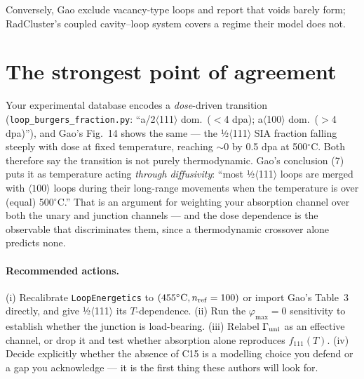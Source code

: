 \documentclass[11pt,a4paper]{article}
\newcommand{\code}[1]{\texttt{\small #1}}
\begin{document}
Conversely, Gao exclude vacancy-type loops and report that voids barely form; RadCluster's
coupled cavity--loop system covers a regime their model does not.

\section{The strongest point of agreement}

Your experimental database encodes a \emph{dose}-driven transition
(\code{loop\_burgers\_fraction.py}: ``a/2$\langle$111$\rangle$ dom.\ ($<$4 dpa);
a$\langle$100$\rangle$ dom.\ ($>$4 dpa)''), and Gao's Fig.~14 shows the same --- the
½$\langle$111$\rangle$ SIA fraction falling steeply with dose at fixed temperature,
reaching $\sim\!0$ by 0.5 dpa at 500$^\circ$C. Both therefore say the transition is not
purely thermodynamic. Gao's conclusion (7) puts it as temperature acting \emph{through
diffusivity}: ``most ½$\langle$111$\rangle$ loops are merged with $\langle100\rangle$ loops
during their long-range movements when the temperature is over (equal) 500$^\circ$C.''
That is an argument for weighting your absorption channel over both the unary and junction
channels --- and the dose dependence is the observable that discriminates them, since a
thermodynamic crossover alone predicts none.

\paragraph{Recommended actions.}
(i) Recalibrate \code{LoopEnergetics} to $(455^\circ\mathrm{C},n_{\rm ref}=100)$ or import
Gao's Table~3 directly, and give ½$\langle$111$\rangle$ its $T$-dependence.
(ii) Run the $\varphi_{\max}\!=\!0$ sensitivity to establish whether the junction is
load-bearing.
(iii) Relabel $\Gamma_{\rm uni}$ as an effective channel, or drop it and test whether
absorption alone reproduces $f_{111}(T)$.
(iv) Decide explicitly whether the absence of C15 is a modelling choice you defend or a gap
you acknowledge --- it is the first thing these authors will look for.
\end{document}

